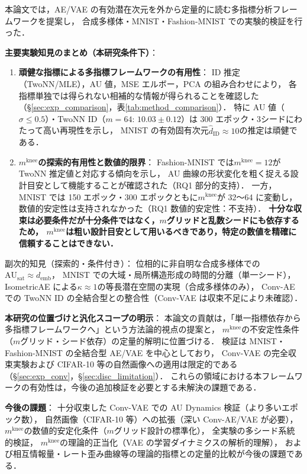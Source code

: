 \documentclass[11pt,a4paper]{jsarticle}
\newcommand{\kap}{\kappa}
\newcommand{\AUsat}{\mathrm{AU}_{\mathrm{sat}}}
\newcommand{\mknee}{m^{\mathrm{knee}}}
\newcommand{\demb}{d_{\mathrm{emb}}}
\begin{document}
本論文では，AE/VAE の有効潜在次元を外から定量的に読む多指標分析フレームワークを提案し，
合成多様体・MNIST・Fashion-MNIST での実験的検証を行った．

\textbf{主要実験知見のまとめ（本研究条件下）}：
\begin{enumerate}
  \item \textbf{頑健な指標による多指標フレームワークの有用性}：
        ID 推定（TwoNN/MLE），AU 値，MSE エルボー，PCA の組み合わせにより，
        各指標単独では得られない相補的な情報が得られることを確認した
        （§\ref{sec:exp_comparison}，表\ref{tab:method_comparison}）．
        特に AU 値（$\sigma \leq 0.5$）・TwoNN ID（$m=64$: $10.03 \pm 0.12$）は
        300 エポック・3シードにわたって高い再現性を示し，
        MNIST の有効固有次元$\hat{d}_\mathrm{ID} \approx 10$の推定は頑健である．
  \item \textbf{$\mknee$の探索的有用性と数値的限界}：
        Fashion-MNIST では$\mknee = 12$が TwoNN 推定値と対応する傾向を示し，
        AU 曲線の形状変化を粗く捉える設計目安として機能することが確認された（RQ1 部分的支持）．
        一方，MNIST では 150 エポック・300 エポックともに$\mknee$が 32〜64 に変動し，
        数値的安定性は支持されなかった（RQ1 数値的安定性：不支持）．
        \textbf{十分な収束は必要条件だが十分条件ではなく，$m$グリッドと乱数シードにも依存するため，
        $\mknee$は粗い設計目安として用いるべきであり，特定の数値を精確に信頼することはできない．}
\end{enumerate}

副次的知見（探索的・条件付き）：
位相的に非自明な合成多様体での$\AUsat \approx \demb$，
MNIST での大域・局所構造形成の時間的分離（単一シード），
IsometricAE による$\kap \approx 1$の等長潜在空間の実現（合成多様体のみ），
Conv-AE での TwoNN ID の全結合型との整合性（Conv-VAE は収束不足により未確認）．

\textbf{本研究の位置づけと汎化スコープの明示}：
本論文の貢献は，「単一指標依存から多指標フレームワークへ」という方法論的視点の提案と，
$\mknee$の不安定性条件（$m$グリッド・シード依存）の定量的解明に位置づける．
検証は MNIST・Fashion-MNIST の全結合型 AE/VAE を中心としており，
Conv-VAE の完全収束実験および CIFAR-10 等の自然画像への適用は限定的である（§\ref{sec:exp_conv}，§\ref{sec:disc_limitation}）．
これらの領域における本フレームワークの有効性は，今後の追加検証を必要とする未解決の課題である．

\textbf{今後の課題}：
十分収束した Conv-VAE での AU Dynamics 検証（より多いエポック数），
自然画像（CIFAR-10 等）への拡張（深い Conv-AE/VAE が必要），
$\mknee$の数値的安定化条件（$m$グリッド設計の標準化），
全実験の多シード系統的検証，
$\mknee$の理論的正当化（VAE の学習ダイナミクスの解析的理解），
および相互情報量・レート歪み曲線等の理論的指標との定量的比較が今後の課題である．
\end{document}
